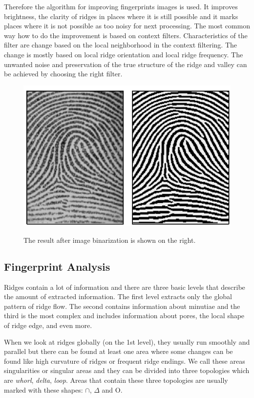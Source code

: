 Therefore the algorithm for improving fingerprints images is used. It improves brightness, the clarity of ridges in places where it is still possible and it marks places where it is not possible as too noisy for next processing. The most common way how to do the improvement is based on context filters. Characteristics of the filter are change based on the local neighborhood in the context filtering. The change is mostly based on local ridge orientation and local ridge frequency. The unwanted noise and preservation of the true structure of the ridge and valley can be achieved by choosing the right filter. \cite{jain2007handbook} \cite{binarization}

\begin{figure}[H]
    \centering
        {\includegraphics[width=0.6\linewidth]{obrazky-figures/enhancement.png}}\\
        \caption{The result after image binarization is shown on the right. \cite{maltoni2009handbook}}
\end{figure}

\subsection{Fingerprint Analysis}
Ridges contain a lot of information and there are three basic levels that describe the amount of extracted information. The first level extracts only the global pattern of ridge flow. The second contains information about minutiae and the third is the most complex and includes information about pores, the local shape of ridge edge, and even more. \cite{daluz2018fundamentals} \cite{maltoni2009handbook}

When we look at ridges globally (on the 1st level), they usually run smoothly and parallel but there can be found at least one area where some changes can be found like high curvature of ridges or frequent ridge endings. We call these areas singularities or singular areas and they can be divided into three topologies which are \emph{whorl}, \emph{delta}, \emph{loop}. Areas that contain these three topologies are usually marked with these shapes:  $\cap$, $\Delta$ and O. \cite{msiza2011introduction} \cite{maltoni2009handbook}

